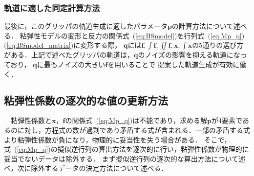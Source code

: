 \documentclass[a4paper]{jarticle}
\begin{document}
\subsubsection{軌道に適した同定計算方法}
\label{subsubsec:approproate_calculation}
最後に，このグリッパの軌道生成に適したパラメータ$\mathbf{p}$の計算方法について述べる．
粘弾性モデルの変形と反力の関係式~(\ref{eq:BSmodel})を行列式~(\ref{eq:Mp_q})(\ref{eq:BSmodel_matrix})に変形する際，
$\mathbf{q}$には$\boldsymbol{f}, \int{\boldsymbol{f}} , \iint{\boldsymbol{f}}, \boldsymbol{x} , \int{\boldsymbol{x}}$の5通りの選び方がある．上記で述べたグリッパの軌道は，$\mathbf{q}$のノイズの影響を抑える軌道になっており，
$\mathbf{q}$に最もノイズの大きい$\boldsymbol{f}$を用いることで
提案した軌道生成が有効に働く．

\subsection{粘弾性係数の逐次的な値の更新方法}\label{subsec:downsample}
　粘弾性係数と$\boldsymbol{x}$，$\boldsymbol{f}$の関係式~(\ref{eq:Mp_q})は不能であり，求める解$\mathbf{p}$が4要素であるのに対し，方程式の数が過剰であり矛盾する式が含まれる．一部の矛盾する式より粘弾性係数が負になり，物理的に妥当性を失う場合がある．
そこで，式~(\ref{eq:Mp_q})の擬似逆行列の算出方法を逐次的に行い，粘弾性係数が物理的に妥当でないデータは除外する．
まず擬似逆行列の逐次的な算出方法について述べ，次に除外するデータの決定方法について述べる．
\end{document}
